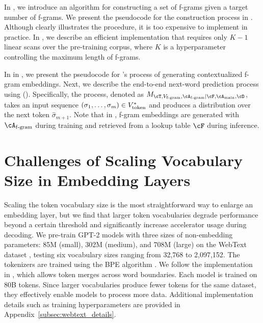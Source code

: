 In , we introduce an algorithm for constructing a set of f-grams given a target number of f-grams. We present the pseudocode for the construction process in . Although  clearly illustrates the procedure, it is too expensive to implement in practice. In , we describe an efficient implementation that requires only $K-1$ linear scans over the pre-training corpus, where $K$ is a hyperparameter controlling the maximum length of f-grams.




In  in , we present the pseudocode for \SCONE's process of generating contextualized f-gram embeddings. Next, we describe the end-to-end next-word prediction process using \SCONE (). Specifically, the process, denoted as $M_{\cT, \Vfgram, \train{\Afgram} | \infer{\cF}, \Amain, \cD}$, takes an input sequence $(\sigma_1, \ldots, \sigma_m) \in V_{\mathrm{token}}^*$ and produces a distribution over the next token $\hat{\sigma}_{m+1}$. Note that in , f-gram embeddings are generated with $\Afgram$ during training and retrieved from a lookup table $\cF$ during inference.



\section{Challenges of Scaling Vocabulary Size in Embedding Layers}
\label{sec:scale_vocab}

Scaling the token vocabulary size is the most straightforward way to enlarge an embedding layer, but we find that larger token vocabularies degrade performance beyond a certain threshold and significantly increase accelerator usage during decoding. We pre-train GPT-2 models \citep{radford2019language} with three sizes of non-embedding parameters: 85M (small), 302M (medium), and 708M (large) on the WebText dataset \citep{openwebtext}, testing six vocabulary sizes ranging from 32,768 to 2,097,152. The tokenizers are trained using the BPE algorithm \citep{gage1994new, sennrich2015neural}. We follow the implementation in \citet{tao2024scaling}, which allows token merges across word boundaries. Each model is trained on 80B tokens. Since larger vocabularies produce fewer tokens for the same dataset, they effectively enable models to process more data. Additional implementation details such as training hyperparameters are provided in Appendix~\ref{subsec:webtext_details}.

